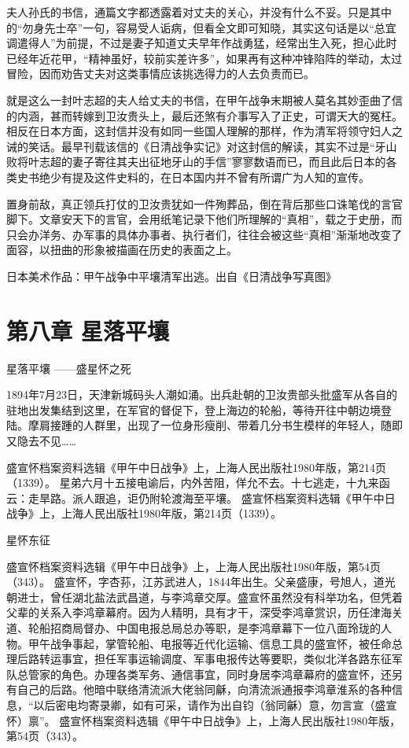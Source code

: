 \documentclass[12pt,UTF8]{ctexbook}
\begin{document}
夫人孙氏的书信，通篇文字都透露着对丈夫的关心，并没有什么不妥。只是其中的“勿身先士卒”一句，容易受人诟病，但看全文即可知晓，其实这句话是以“总宜调遣得人”为前提，不过是妻子知道丈夫早年作战勇猛，经常出生入死，担心此时已经年近花甲，“精神虽好，较前实差许多”，如果再有这种冲锋陷阵的举动，太过冒险，因而劝告丈夫对这类事情应该挑选得力的人去负责而已。

就是这么一封叶志超的夫人给丈夫的书信，在甲午战争末期被人莫名其妙歪曲了信的内涵，甚而转嫁到卫汝贵头上，最后还煞有介事写入了正史，可谓天大的冤枉。相反在日本方面，这封信并没有如同一些国人理解的那样，作为清军将领守妇人之诫的笑话。最早刊载该信的《日清战争实记》对这封信的解读，其实不过是“牙山败将叶志超的妻子寄往其夫出征地牙山的手信”寥寥数语而已，而且此后日本的各类史书绝少有提及这件史料的，在日本国内并不曾有所谓广为人知的宣传。

置身前敌，真正领兵打仗的卫汝贵犹如一件殉葬品，倒在背后那些口诛笔伐的言官脚下。文章安天下的言官，会用纸笔记录下他们所理解的“真相”，载之于史册，而只会办洋务、办军事的具体办事者、执行者们，往往会被这些“真相”渐渐地改变了面容，以扭曲的形象被描画在历史的表面之上。


日本美术作品：甲午战争中平壤清军出逃。出自《日清战争写真图》

\chapter{第八章 星落平壤}

星落平壤
——盛星怀之死

1894年7月23日，天津新城码头人潮如涌。出兵赴朝的卫汝贵部头批盛军从各自的驻地出发集结到这里，在军官的督促下，登上海边的轮船，等待开往中朝边境登陆。摩肩接踵的人群里，出现了一位身形瘦削、带着几分书生模样的年轻人，随即又隐去不见……

盛宣怀档案资料选辑《甲午中日战争》上，上海人民出版社1980年版，第214页（1339）。
星弟六月十五接电谕后，内外苦阻，佯允不去。十七逃走，十九来函云：走旱路。派人跟追，讵仍附轮渡海至平壤。 盛宣怀档案资料选辑《甲午中日战争》上，上海人民出版社1980年版，第214页（1339）。

星怀东征

盛宣怀档案资料选辑《甲午中日战争》上，上海人民出版社1980年版，第54页（343）。
盛宣怀，字杏荪，江苏武进人，1844年出生。父亲盛康，号旭人，道光朝进士，曾任湖北盐法武昌道，与李鸿章交厚。盛宣怀虽然没有科举功名，但凭着父辈的关系入李鸿章幕府。因为人精明，具有才干，深受李鸿章赏识，历任津海关道、轮船招商局督办、中国电报总局总办等职，是李鸿章幕下一位八面玲珑的人物。甲午战争事起，掌管轮船、电报等近代化运输、信息工具的盛宣怀，被任命总理后路转运事宜，担任军事运输调度、军事电报传达等要职，类似北洋各路东征军队总管家的角色。办理各类军务、通信事宜，同时身居李鸿章幕府的盛宣怀，还另有自己的后路。他暗中联络清流派大佬翁同龢，向清流派通报李鸿章淮系的各种信息，“以后密电均寄录卿，如有可采，请作为出自钧（翁同龢）意，勿言宣（盛宣怀）禀”。 盛宣怀档案资料选辑《甲午中日战争》上，上海人民出版社1980年版，第54页（343）。
\end{document}

